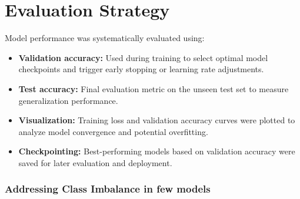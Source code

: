 \documentclass[a4paper,12pt]{article}
\begin{document}
\section{Evaluation Strategy}
Model performance was systematically evaluated using:
\begin{itemize}
\item \textbf{Validation accuracy:} Used during training to select optimal model checkpoints and trigger early stopping or learning rate adjustments.
\item \textbf{Test accuracy:} Final evaluation metric on the unseen test set to measure generalization performance.
\item \textbf{Visualization:} Training loss and validation accuracy curves were plotted to analyze model convergence and potential overfitting.
\item \textbf{Checkpointing:} Best-performing models based on validation accuracy were saved for later evaluation and deployment.
\end{itemize}

\subsubsection{Addressing Class Imbalance in few models}
\end{document}
